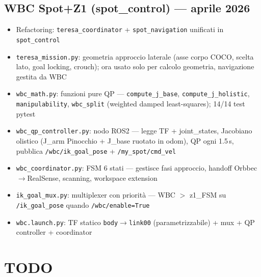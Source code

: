 \documentclass[a4paper,11pt]{article}
\begin{document}
\begin{donebox}
\subsection*{WBC Spot+Z1 (spot\_control) — aprile 2026}
\begin{itemize}[leftmargin=1.5em]
  \item[\checkmark] Refactoring: \texttt{teresa\_coordinator} + \texttt{spot\_navigation}
        unificati in \texttt{spot\_control}
  \item[\checkmark] \texttt{teresa\_mission.py}: geometria approccio laterale (asse corpo COCO,
        scelta lato, goal locking, crouch); ora usato solo per calcolo geometria,
        navigazione gestita da WBC
  \item[\checkmark] \texttt{wbc\_math.py}: funzioni pure QP — \texttt{compute\_j\_base},
        \texttt{compute\_j\_holistic}, \texttt{manipulability}, \texttt{wbc\_split}
        (weighted damped least-squares); 14/14 test pytest
  \item[\checkmark] \texttt{wbc\_qp\_controller.py}: nodo ROS2 — legge TF + joint\_states,
        Jacobiano olistico (J\_arm Pinocchio + J\_base ruotato in odom), QP ogni 1.5\,s,
        pubblica \texttt{/wbc/ik\_goal\_pose} + \texttt{/my\_spot/cmd\_vel}
  \item[\checkmark] \texttt{wbc\_coordinator.py}: FSM 6 stati — gestisce fasi approccio,
        handoff Orbbec$\to$RealSense, scanning, workspace extension
  \item[\checkmark] \texttt{ik\_goal\_mux.py}: multiplexer con priorità —
        WBC $>$ z1\_FSM su \texttt{/ik\_goal\_pose} quando \texttt{/wbc/enable=True}
  \item[\checkmark] \texttt{wbc.launch.py}: TF statico \texttt{body}$\to$\texttt{link00}
        (parametrizzabile) + mux + QP controller + coordinator
\end{itemize}
\end{donebox}

\section{TODO}
\end{document}
